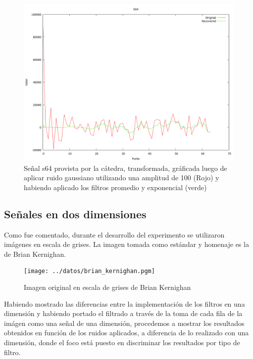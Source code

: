 \begin{figure}
\begin {center}
\includegraphics[width=360pt]{../matlab/s64-gauss100-both-spec.png}
\end {center}
\caption{Se\~nal s64 provista por la c\'atedra, transformada, gr\'aficada
luego de aplicar ruido gaussiano utilizando una amplitud de 100 (Rojo) y 
habiendo aplicado los filtros promedio y exponencial (verde)}
\label{fig:SinProm}
\end{figure}


\subsection{Se\~nales en dos dimensiones}

Como fue comentado, durante el desarrollo del experimento se utilizaron
im\'agenes en escala de grises. La imagen tomada como est\'andar y homenaje es 
la de Brian Kernighan.

\begin{figure}[H]
\begin {center}
\texttt{[image: ../datos/brian\_kernighan.pgm]}
\end {center}
\caption{Imagen original en escala de grises de Brian Kernighan}
\label{fig:SinProm}
\end{figure}

Habiendo mostrado las diferencias entre la implementaci\'on de los filtros en
una dimensi\'on y habiendo portado el filtrado a trav\'es de la toma de cada
fila de la im\'agen como una se\~nal de una dimensi\'on, procedemos a mostrar
los resultados obtenidos en funci\'on de los ruidos aplicados, a diferencia de
lo realizado con una dimensi\'on, donde el foco est\'a puesto en discriminar los
resultados por tipo de filtro.

